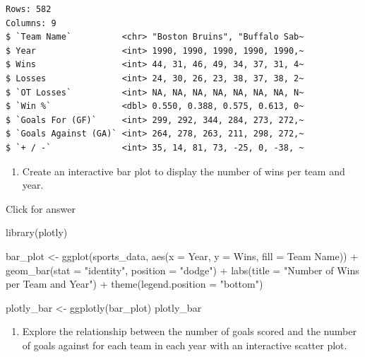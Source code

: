 \documentclass[
]{book}
\newenvironment{Shaded}{\begin{snugshade}}{\end{snugshade}}
\newcommand{\AttributeTok}[1]{\textcolor[rgb]{0.77,0.63,0.00}{#1}}
\newcommand{\FunctionTok}[1]{\textcolor[rgb]{0.00,0.00,0.00}{#1}}
\newcommand{\NormalTok}[1]{#1}
\newcommand{\OtherTok}[1]{\textcolor[rgb]{0.56,0.35,0.01}{#1}}
\newcommand{\SpecialCharTok}[1]{\textcolor[rgb]{0.00,0.00,0.00}{#1}}
\newcommand{\StringTok}[1]{\textcolor[rgb]{0.31,0.60,0.02}{#1}}
\providecommand{\tightlist}{%
  \setlength{\itemsep}{0pt}\setlength{\parskip}{0pt}}
\begin{document}
\begin{verbatim}
Rows: 582
Columns: 9
$ `Team Name`          <chr> "Boston Bruins", "Buffalo Sab~
$ Year                 <int> 1990, 1990, 1990, 1990, 1990,~
$ Wins                 <int> 44, 31, 46, 49, 34, 37, 31, 4~
$ Losses               <int> 24, 30, 26, 23, 38, 37, 38, 2~
$ `OT Losses`          <int> NA, NA, NA, NA, NA, NA, NA, N~
$ `Win %`              <dbl> 0.550, 0.388, 0.575, 0.613, 0~
$ `Goals For (GF)`     <int> 299, 292, 344, 284, 273, 272,~
$ `Goals Against (GA)` <int> 264, 278, 263, 211, 298, 272,~
$ `+ / -`              <int> 35, 14, 81, 73, -25, 0, -38, ~
\end{verbatim}

\begin{enumerate}
\def\labelenumi{\arabic{enumi}.}
\setcounter{enumi}{3}
\tightlist
\item
  Create an interactive bar plot to display the number of wins per team and year.
\end{enumerate}

Click for answer

\begin{Shaded}
\begin{Highlighting}[]
\FunctionTok{library}\NormalTok{(plotly)}

\NormalTok{bar\_plot }\OtherTok{\textless{}{-}} \FunctionTok{ggplot}\NormalTok{(sports\_data, }\FunctionTok{aes}\NormalTok{(}\AttributeTok{x =}\NormalTok{ Year, }\AttributeTok{y =}\NormalTok{ Wins, }\AttributeTok{fill =} \StringTok{\textasciigrave{}}\AttributeTok{Team Name}\StringTok{\textasciigrave{}}\NormalTok{)) }\SpecialCharTok{+}
  \FunctionTok{geom\_bar}\NormalTok{(}\AttributeTok{stat =} \StringTok{"identity"}\NormalTok{, }\AttributeTok{position =} \StringTok{"dodge"}\NormalTok{) }\SpecialCharTok{+}
  \FunctionTok{labs}\NormalTok{(}\AttributeTok{title =} \StringTok{"Number of Wins per Team and Year"}\NormalTok{) }\SpecialCharTok{+}
  \FunctionTok{theme}\NormalTok{(}\AttributeTok{legend.position =} \StringTok{"bottom"}\NormalTok{)}

\NormalTok{plotly\_bar }\OtherTok{\textless{}{-}} \FunctionTok{ggplotly}\NormalTok{(bar\_plot)}
\NormalTok{plotly\_bar}
\end{Highlighting}
\end{Shaded}

\begin{enumerate}
\def\labelenumi{\arabic{enumi}.}
\setcounter{enumi}{4}
\tightlist
\item
  Explore the relationship between the number of goals scored and the number of goals against for each team in each year with an interactive scatter plot.
\end{enumerate}
\end{document}
